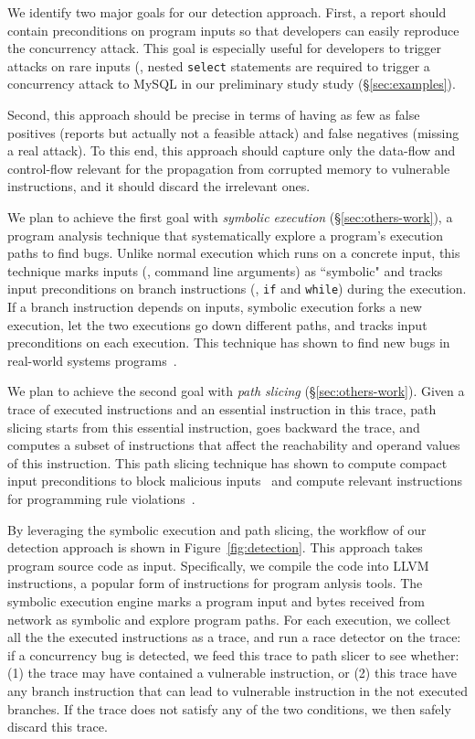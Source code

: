 We identify two major goals for our detection approach. First, a report should 
contain preconditions on program inputs so that developers can easily reproduce 
the concurrency attack. This goal is especially useful for developers to 
trigger attacks on rare inputs (\eg, nested \texttt{select} statements are 
required to trigger a concurrency attack to MySQL in our preliminary 
study study (\S\ref{sec:examples}).

Second, this approach should be precise in terms of having as few as false 
positives (reports but actually not a feasible attack) and false negatives 
(missing a real attack). To this end, this approach should capture only the 
data-flow and control-flow relevant for the propagation from corrupted memory 
to vulnerable instructions, and it should discard the irrelevant ones. 

We plan to achieve the first goal with \emph{symbolic 
execution} (\S\ref{sec:others-work}), a program analysis technique that 
systematically explore a program's execution paths to find bugs. Unlike normal 
execution which runs on a concrete input, this technique marks inputs (\eg, 
command line arguments) as ``symbolic" and tracks input preconditions 
on branch instructions (\eg, \texttt{if} and \texttt{while}) during the 
execution. If a branch instruction depends on inputs, symbolic execution forks 
a new execution, let the two executions go down different paths, and tracks 
input preconditions on each execution. This technique has shown to find new 
bugs in real-world systems programs~\cite{klee:osdi08}.

We plan to achieve the second goal with \emph{path slicing} 
(\S\ref{sec:others-work}). Given a 
trace of executed instructions and an essential instruction in this trace, 
path slicing starts from this essential instruction, goes backward the trace, 
and computes a subset of instructions that affect the reachability and operand 
values of this instruction. This path slicing technique has shown to compute 
compact input preconditions to block malicious inputs~\cite{castro:bouncer} and 
compute relevant instructions for programming rule 
violations~\cite{woodpecker:asplos13}.

By leveraging the symbolic execution and path slicing, the workflow of our 
detection approach is shown in Figure~\ref{fig:detection}. This approach takes 
program source code as input. Specifically, we compile the code into 
LLVM~\cite{llvm} instructions, a popular form of instructions for program 
anlysis tools. The symbolic execution engine marks a program input and bytes 
received from network as symbolic and explore program paths. For each execution, 
we collect all the the executed instructions as a trace, and run a race detector 
on the trace: if a concurrency bug is detected, we feed this trace to path 
slicer to see whether: (1) the trace may have contained a vulnerable 
instruction, or (2) this trace have any branch instruction that can lead to 
vulnerable instruction in the not executed branches. If the trace does not 
satisfy any of the two conditions, we then safely discard this trace.

